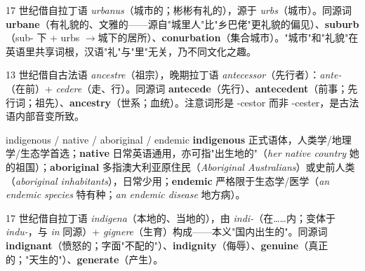 \documentclass[../main.tex]{subfiles}
\begin{document}
\begin{origin}
17 世纪借自拉丁语 \textit{urbanus}（城市的；彬彬有礼的），源于 \textit{urbs}（城市）。同源词 \textbf{urbane}（有礼貌的、文雅的——源自"城里人"比"乡巴佬"更礼貌的偏见）、\textbf{suburb}（sub- 下 + urbs $\to$城下的居所）、\textbf{conurbation}（集合城市）。"城市"和"礼貌"在英语里共享词根，汉语"礼"与"里"无关，乃不同文化之趣。
\end{origin}




\begin{origin}
13 世纪借自古法语 \textit{ancestre}（祖宗），晚期拉丁语 \textit{antecessor}（先行者）：\textit{ante-}（在前）+ \textit{cedere}（走、行）。同源词 \textbf{antecede}（先行）、\textbf{antecedent}（前事；先行词；祖先）、\textbf{ancestry}（世系；血统）。注意词形是 -cestor 而非 -cester，是古法语内部音变所致。
\end{origin}



\begin{lex}{indigenous / native / aboriginal / endemic}
\textbf{indigenous} 正式语体，人类学/地理学/生态学首选；\textbf{native} 日常英语通用，亦可指"出生地的"（\textit{her native country} 她的祖国）；\textbf{aboriginal} 多指澳大利亚原住民（\textit{Aboriginal Australians}）或史前人类（\textit{aboriginal inhabitants}），日常少用；\textbf{endemic} 严格限于生态学/医学（\textit{an endemic species} 特有种；\textit{an endemic disease} 地方病）。
\end{lex}

\begin{origin}
17 世纪借自拉丁语 \textit{indigena}（本地的、当地的），由 \textit{indi-}（在……内；变体于 \textit{indu-}，与 \textit{in} 同源）+ \textit{gignere}（生育）构成——本义"国内出生的"。同源词 \textbf{indignant}（愤怒的；字面"不配的"）、\textbf{indignity}（侮辱）、\textbf{genuine}（真正的；"天生的"）、\textbf{generate}（产生）。
\end{origin}
\end{document}
